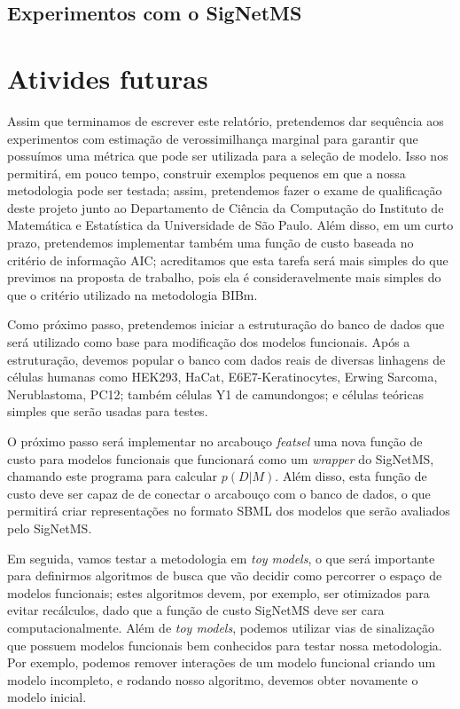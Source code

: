 \documentclass[12pt]{article}
\newcommand{\foreignword}[1]{\textit{#1}}
\begin{document}
\subsection{Experimentos com o SigNetMS}


\section{Ativides futuras}
Assim que terminamos de escrever este relatório, pretendemos dar 
sequência aos experimentos com estimação de verossimilhança marginal 
para garantir que possuímos uma métrica que pode ser utilizada para a
seleção de modelo. Isso nos permitirá, em pouco tempo, construir 
exemplos pequenos em que a nossa metodologia pode ser testada; assim,
pretendemos fazer o exame de qualificação deste projeto junto ao 
Departamento de Ciência da Computação do Instituto de Matemática e 
Estatística da Universidade de São Paulo. Além disso, em um curto prazo,
pretendemos implementar também uma função de custo baseada no critério
de informação AIC; acreditamos que esta tarefa será mais simples do que
previmos na proposta de trabalho, pois ela é consideravelmente mais 
simples do que o critério utilizado na metodologia BIBm.

Como próximo passo, pretendemos iniciar a estruturação do banco de dados 
que será utilizado como base para modificação dos modelos funcionais. 
Após a estruturação, devemos popular o banco com dados reais de diversas 
linhagens de células humanas como HEK293, HaCat, E6E7-Keratinocytes,
Erwing Sarcoma, Nerublastoma, PC12; também células Y1 de camundongos; e
células teóricas simples que serão usadas para testes.

O próximo passo será implementar no arcabouço {\em featsel} uma nova
função de custo para modelos funcionais que funcionará como um 
\foreignword{wrapper} do SigNetMS, chamando este programa para calcular 
$p (D | M)$. Além disso, esta função de custo deve ser capaz de de
conectar o arcabouço com o banco de dados, o que permitirá criar 
representações no formato SBML dos modelos que serão avaliados pelo 
SigNetMS. 

Em seguida, vamos testar a metodologia em 
\foreignword{toy models}, o que será importante para definirmos 
algoritmos de busca que vão decidir como percorrer o espaço de modelos
funcionais; estes algoritmos devem, por exemplo, ser otimizados para 
evitar recálculos, dado que a função de custo SigNetMS deve ser cara
computacionalmente. Além de \foreignword{toy models}, podemos utilizar 
vias de sinalização que possuem modelos funcionais bem conhecidos para 
testar nossa metodologia. Por exemplo, podemos remover interações de um 
modelo funcional criando um modelo incompleto, e rodando nosso 
algoritmo, devemos obter novamente o modelo inicial.
\end{document}
